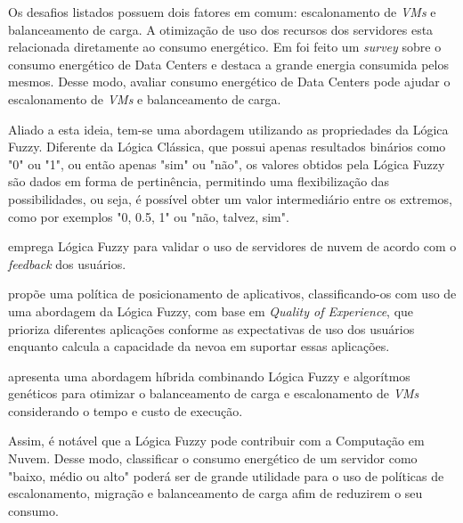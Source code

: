 Os desafios listados possuem dois fatores em comum: escalonamento de \textit{VMs} e balanceamento de carga. A otimização de uso dos recursos dos servidores esta relacionada diretamente ao consumo energético. Em  \cite{dayarathna2016data} foi feito um \textit{survey} sobre o consumo energético de Data Centers e destaca a grande energia consumida pelos mesmos. Desse modo, avaliar consumo energético de Data Centers pode ajudar o escalonamento de \textit{VMs} e balanceamento de carga.
 
Aliado a esta ideia, tem-se uma abordagem utilizando as propriedades da Lógica Fuzzy\cite{zadeh1988fuzzy}. %
Diferente da Lógica Clássica, que possui apenas resultados binários como "0" ou "1", ou então apenas "sim" ou "não", os valores obtidos pela Lógica Fuzzy são dados em forma de pertinência, permitindo uma flexibilização das possibilidades, ou seja, é possível obter um valor intermediário entre os extremos, como por exemplos "0, 0.5, 1" ou "não, talvez, sim".



\cite{wang2014towards} emprega Lógica Fuzzy para validar o uso de servidores de nuvem de acordo com o \textit{feedback} dos usuários.

\cite{mahmud2018quality} propõe uma política de posicionamento de aplicativos, classificando-os com uso de uma abordagem da Lógica Fuzzy, com base em \textit{Quality of Experience}, que prioriza diferentes aplicações conforme as expectativas de uso dos usuários enquanto calcula a capacidade da nevoa em suportar essas aplicações.

\cite{Shojafar2015} apresenta uma abordagem híbrida combinando Lógica Fuzzy e algorítmos genéticos para otimizar o balanceamento de carga e escalonamento de \textit{VMs} considerando o tempo e custo de execução.

Assim, é notável que a Lógica Fuzzy pode contribuir com a Computação em Nuvem. Desse modo, classificar o consumo energético de um servidor como "baixo, médio ou alto" poderá ser de grande utilidade para o uso de políticas de escalonamento, migração e balanceamento de carga afim de reduzirem o seu consumo.



